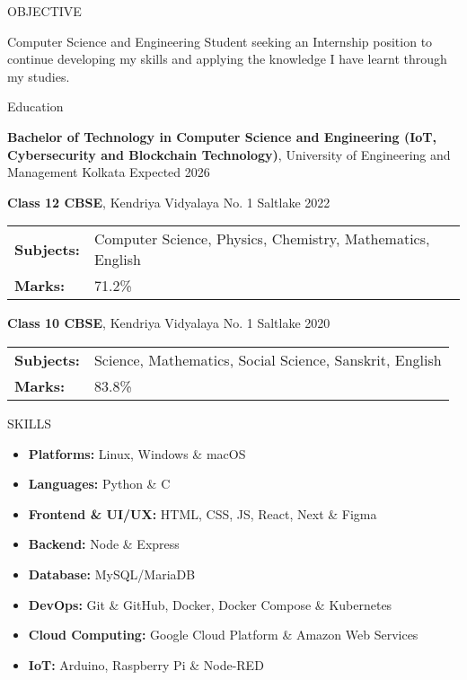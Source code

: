 \documentclass{resume}
\begin{document}
\vspace{0.8em}
\begin{rSection}{OBJECTIVE}

{Computer Science and Engineering Student seeking an Internship position to continue developing my skills and applying the knowledge I have learnt through my studies.}

\end{rSection}
\vspace{0.8em}
\begin{rSection}{Education}

{\bf Bachelor of Technology in Computer Science and Engineering (IoT, Cybersecurity and Blockchain Technology)}, University of Engineering and Management Kolkata \hfill {Expected 2026}\\
\vspace{1em}

{\bf Class 12 CBSE}, Kendriya Vidyalaya No. 1 Saltlake \hfill {2022}\\
\begin{tabular}{>{\bfseries}l l}
Subjects: & Computer Science, Physics, Chemistry, Mathematics, English \\
Marks: & 71.2\%
\end{tabular}

{\bf Class 10 CBSE}, Kendriya Vidyalaya No. 1 Saltlake \hfill {2020}
\begin{tabular}{>{\bfseries}l l}
Subjects: & Science, Mathematics, Social Science, Sanskrit, English \\
Marks: & 83.8\%
\end{tabular}


\end{rSection}
\vspace{0.8em}
\begin{rSection}{SKILLS}

\begin{itemize}
    \item \textbf{Platforms:} Linux, Windows \& macOS
    \item \textbf{Languages:} Python \& C
    \item \textbf{Frontend \& UI/UX: } HTML, CSS, JS, React, Next \& Figma
    \item \textbf{Backend: } Node \& Express
    \item \textbf{Database: } MySQL/MariaDB
    \item \textbf{DevOps:} Git \& GitHub, Docker, Docker Compose \& Kubernetes
    \item \textbf{Cloud Computing:} Google Cloud Platform \& Amazon Web Services
    \item \textbf{IoT:} Arduino, Raspberry Pi \& Node-RED
\end{itemize}
\end{rSection}
\end{document}
